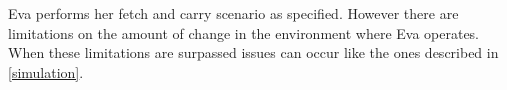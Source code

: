 \documentclass[project_eva.tex]{subfiles}
\begin{document}
Eva performs her fetch and carry scenario as specified. However there are limitations on the amount of change in the environment where Eva operates. When these limitations are surpassed issues can occur like the ones described in \ref{simulation}.
\end{document}
